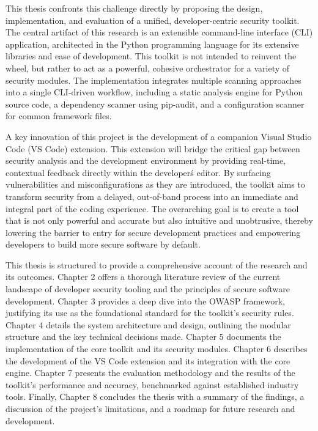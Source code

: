 This thesis confronts this challenge directly by proposing the design, implementation, and evaluation of a unified, developer-centric security toolkit. The central artifact of this research is an extensible command-line interface (CLI) application, architected in the Python programming language for its extensive libraries and ease of development. This toolkit is not intended to reinvent the wheel, but rather to act as a powerful, cohesive orchestrator for a variety of security modules. The implementation integrates multiple scanning approaches into a single CLI-driven workflow, including a static analysis engine for Python source code, a dependency scanner using pip-audit, and a configuration scanner for common framework files.

A key innovation of this project is the development of a companion Visual Studio Code (VS Code) extension. This extension will bridge the critical gap between security analysis and the development environment by providing real-time, contextual feedback directly within the developer\'s editor. By surfacing vulnerabilities and misconfigurations as they are introduced, the toolkit aims to transform security from a delayed, out-of-band process into an immediate and integral part of the coding experience. The overarching goal is to create a tool that is not only powerful and accurate but also intuitive and unobtrusive, thereby lowering the barrier to entry for secure development practices and empowering developers to build more secure software by default.

This thesis is structured to provide a comprehensive account of the research and its outcomes. Chapter 2 offers a thorough literature review of the current landscape of developer security tooling and the principles of secure software development. Chapter 3 provides a deep dive into the OWASP framework, justifying its use as the foundational standard for the toolkit's security rules. Chapter 4 details the system architecture and design, outlining the modular structure and the key technical decisions made. Chapter 5 documents the implementation of the core toolkit and its security modules. Chapter 6 describes the development of the VS Code extension and its integration with the core engine. Chapter 7 presents the evaluation methodology and the results of the toolkit's performance and accuracy, benchmarked against established industry tools. Finally, Chapter 8 concludes the thesis with a summary of the findings, a discussion of the project's limitations, and a roadmap for future research and development.